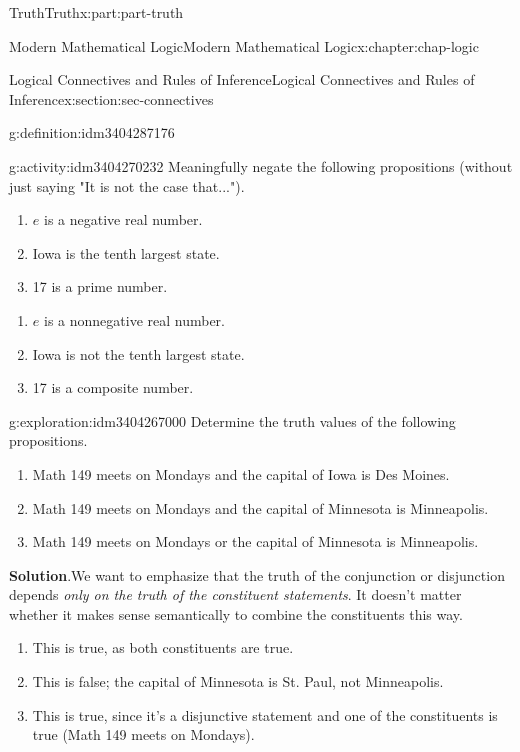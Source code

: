 \documentclass[oneside,10pt,]{book}
\newcommand{\blocktitlefont}{\relax}
\numberwithin{equation}{section}
\begin{document}
\begin{partptx}{Truth}{}{Truth}{}{}{x:part:part-truth}
\begin{chapterptx}{Modern Mathematical Logic}{}{Modern Mathematical Logic}{}{}{x:chapter:chap-logic}
\begin{sectionptx}{Logical Connectives and Rules of Inference}{}{Logical Connectives and Rules of Inference}{}{}{x:section:sec-connectives}
\begin{definition}{}{g:definition:idm3404287176}
\end{definition}
\begin{activity}{}{g:activity:idm3404270232}%
Meaningfully negate the following propositions (without just saying "It is not the case that...").%
%
\begin{enumerate}
\item{}\(e\) is a negative real number.%
\item{}Iowa is the tenth largest state.%
\item{}17 is a prime number.%
\end{enumerate}
\par\smallskip%
\noindent%
\begin{enumerate}
\item{}\(e\) is a nonnegative real number.%
\item{}Iowa is not the tenth largest state.%
\item{}17 is a composite number.%
\end{enumerate}
\end{activity}%
\begin{exploration}{}{g:exploration:idm3404267000}%
Determine the truth values of the following propositions.%
%
\begin{enumerate}
\item{}Math 149 meets on Mondays and the capital of Iowa is Des Moines.%
\item{}Math 149 meets on Mondays and the capital of Minnesota is Minneapolis.%
\item{}Math 149 meets on Mondays or the capital of Minnesota is Minneapolis.%
\end{enumerate}
\par\smallskip%
\noindent\textbf{\blocktitlefont Solution}.\hypertarget{g:solution:idm3404265432}{}\quad{}We want to emphasize that the truth of the conjunction or disjunction depends \emph{only on the truth of the constituent statements}. It doesn't matter whether it makes sense semantically to combine the constituents this way.%
%
\begin{enumerate}
\item{}This is true, as both constituents are true.%
\item{}This is false; the capital of Minnesota is St. Paul, not Minneapolis.%
\item{}This is true, since it's a disjunctive statement and one of the constituents is true (Math 149 meets on Mondays).%
\end{enumerate}
\end{exploration}%

\end{sectionptx}
\end{chapterptx}
\end{partptx}
\end{document}
